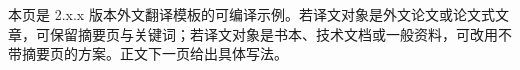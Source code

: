 %

\begin{translationabstract}
本页是 2.x.x 版本外文翻译模板的可编译示例。若译文对象是外文论文或论文式文章，可保留摘要页与关键词；若译文对象是书本、技术文档或一般资料，可改用不带摘要页的方案。正文下一页给出具体写法。
\end{translationabstract}
\newpage
